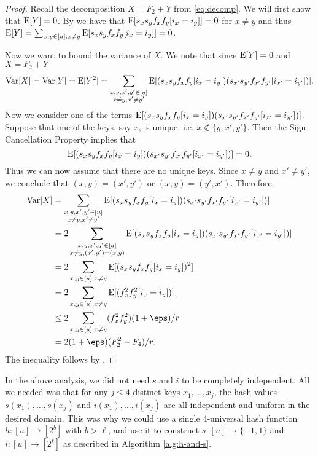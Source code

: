 \begin{proof}
   Recall the decomposition $X=F_2+Y$ from \cref{eq:decomp}.
    We will first show that $\operatorname*{E}[Y] = 0$.
    By  we have that $\operatorname*{E}[s_x s_y f_x f_y [i_x = i_y]] = 0$
    for $x \neq y$ and thus $\operatorname*{E}[Y] = \sum_{x,y\in[u],x\neq y} \operatorname*{E}[s_x s_y f_x f_y [i_x = i_y]] = 0$.

    Now we want to bound the variance of $X$. We note that since $\operatorname*{E}[Y] = 0$ and $X = F_2 + Y$
    \begin{align*}
        \operatorname*{Var}[X] = \operatorname*{Var}[Y] = \operatorname*{E}[Y^2]
            = \sum_{\substack{x, y, x', y' \in [u]\\ x \neq y, x' \neq y'}} \operatorname*{E}[(s_x s_y f_x f_y [i_x = i_y])(s_{x'} s_{y'} f_{x'} f_{y'} [i_{x'} = i_{y'}])] .
    \end{align*}
    Now we consider one of the terms $\operatorname*{E}[(s_x s_y f_x f_y [i_x = i_y])(s_{x'} s_{y'} f_{x'} f_{y'} [i_{x'} = i_{y'}])]$.
    Suppose that one of the keys, say $x$, is unique, i.e. $x \not\in \{y, x', y'\}$.
    Then the Sign Cancellation Property implies that 
    \[
        \operatorname*{E}[(s_x s_y f_x f_y [i_x = i_y])(s_{x'} s_{y'} f_{x'} f_{y'} [i_{x'} = i_{y'}])] = 0 .
    \]
    Thus we can now assume that there are no unique keys. Since $x \neq y$ and $x' \neq y'$, we conclude
    that $(x, y) = (x', y')$ or $(x, y) = (y', x')$. Therefore
    \begin{align*}
       \Var[X] &= \sum_{\substack{x, y, x', y' \in [u]\\ x \neq y, x' \neq y'}}
                \E[(s_x s_y f_x f_y [i_x = i_y])(s_{x'} s_{y'} f_{x'} f_{y'} [i_{x'} = i_{y'}])]
            \\&= 2 \sum_{\substack{x, y, x', y' \in [u]\\ x \neq y, (x', y') = (x, y)}}
                \E[(s_x s_y f_x f_y [i_x = i_y])(s_{x'} s_{y'} f_{x'} f_{y'} [i_{x'} = i_{y'}])]
            \\&= 2\sum_{x,y\in[u],x\neq y} \E[(s_x s_y f_x f_y[i_x=i_y])^2]
            \\&= 2\sum_{x,y\in[u],x\neq y} \E[(f_x^2f_y^2[i_x=i_y])]
            \\&\le 2\sum_{x,y\in[u],x\neq y} (f_x^2f_y^2)(1 + \eps)/r
            \\&= 2(1 + \eps) (F_2^2-F_4)/r.
    \end{align*}
    The inequality follows by .
\end{proof}
In the above analysis, we
did not need $s$ and $i$ to be completely independent. All we needed
was that for any $j\leq 4$ distinct keys $x_1,\ldots,x_j$, the hash
values $s(x_1),\ldots,s(x_j)$ and $i(x_1),\ldots,i(x_j)$ are all
independent and uniform in the desired domain. This was why we could
use a single 4-universal hash function $h:[u]\to[2^b]$ with
$b>\ell$, and use it to construct $s:[u]\to\{-1, 1\}$ and
$i:[u]\to[2^\ell]$ as described in Algorithm \ref{alg:h-and-s}.


